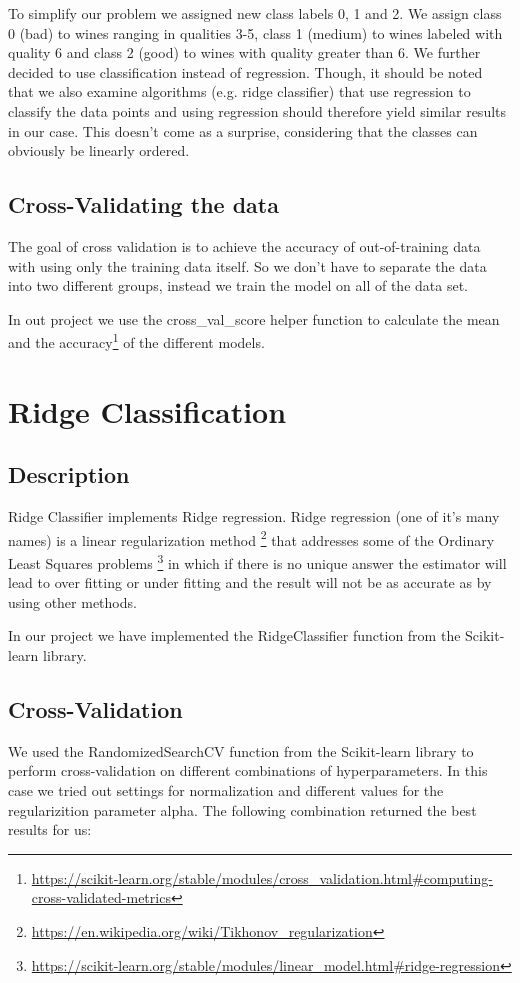 \documentclass[twocolumn]{scrartcl}
\begin{document}
To simplify our problem we assigned new class labels 0, 1 and 2. We assign class 0 (bad) to wines ranging in qualities 3-5,
class 1 (medium) to wines labeled with quality 6 and class 2 (good) to wines with quality greater than 6.
We further decided to use classification instead of regression.
Though, it should be noted that we also examine algorithms (e.g. ridge classifier) that use regression to classify the data points
and using regression should therefore yield similar results in our case.
This doesn't come as a surprise, considering that the classes can obviously be linearly ordered.

\subsection{Cross-Validating the data}
The goal of cross validation is to achieve the accuracy of out-of-training data with using only the training data itself. So we don't have to separate the data into two different groups, instead we train the model on all of the data set.

In out project we use the cross\_val\_score helper function to calculate the mean and the accuracy\footnote{\url{https://scikit-learn.org/stable/modules/cross_validation.html\#computing-cross-validated-metrics}} of the different models.

\section{Ridge Classification}
\subsection{Description}
Ridge Classifier implements Ridge regression.
Ridge regression (one of it's many names) is a linear regularization method
\footnote{\url{https://en.wikipedia.org/wiki/Tikhonov_regularization}}
that addresses some of the Ordinary Least Squares problems
\footnote{\url{https://scikit-learn.org/stable/modules/linear_model.html\#ridge-regression}}
in which if there is no unique answer the estimator will lead to over fitting or under fitting and the result will not be as accurate as by using other methods.

In our project we have implemented the RidgeClassifier function from the Scikit-learn library.
\subsection{Cross-Validation}
We used the RandomizedSearchCV function from the Scikit-learn library to perform cross-validation on different combinations of hyperparameters. In this case we tried out settings for normalization and different values for the regularizition parameter alpha. The following combination returned the best results for us:
\end{document}
